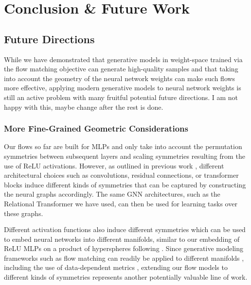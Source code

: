 
\chapter{Conclusion \& Future Work} \label{chapter:discussion}

\section{Future Directions}

While we have demonstrated that generative models in weight-space trained via the flow matching objective can generate high-quality samples and that taking into account the geometry of the neural network weights can make such flows more effective, applying modern generative models to neural network weights is still an active problem with many fruitful potential future directions. {\color{cyan} I am not happy with this, maybe change after the rest is done.}

\subsection{More Fine-Grained Geometric Considerations}

Our flows so far are built for MLPs and only take into account the permutation symmetries between subsequent layers and scaling symmetries resulting from the use of ReLU activations. However, as outlined in previous work \citep{kofinasGraphNeuralNetworks2024,limGraphMetanetworksProcessing2023}, different architectural choices such as convolutions, residual connections, or transformer blocks induce different kinds of symmetries that can be captured by constructing the neural graphs accordingly. The same GNN architectures, such as the Relational Transformer we have used, can then be used for learning tasks over these graphs. 

Different activation functions also induce different symmetries \citep{godfreySymmetriesDeepLearning2022} which can be used to embed neural networks into different manifolds, similar to our embedding of ReLU MLPs on a product of hyperspheres following \citep{pittorinoDeepNetworksToroids2022}. Since generative modeling frameworks such as flow matching can readily be applied to different manifolds \citep{chenRiemannianFlowMatching2023}, including the use of data-dependent metrics \citep{kapusniakMetricFlowMatching2024}, extending our flow models to different kinds of symmetries represents another potentially valuable line of work. 

